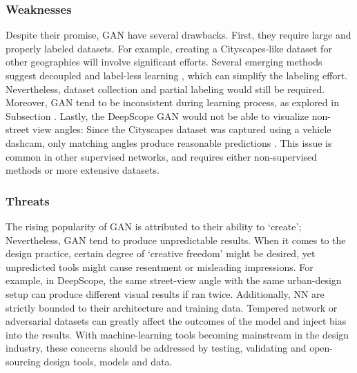 {{        \subsubsection{Weaknesses}\label{weaknesses}
        {
            Despite their promise, GAN have several drawbacks. First, they require large and properly labeled datasets. For example, creating a Cityscapes-like dataset for other geographies will involve significant efforts. Several emerging methods suggest decoupled \cite{zhu2017unpaired} and label-less learning \cite{lucic2019high}, which can simplify the labeling effort. Nevertheless, dataset collection and partial labeling would still be required. Moreover, GAN tend to be inconsistent during learning process, as explored in Subsection  \cite{shin2017continual}. Lastly, the DeepScope GAN would not be able to visualize non-street view angles: Since the Cityscapes dataset was captured using a vehicle dashcam, only matching angles produce reasonable predictions \cite{salimans2016improved}. This issue is common in other supervised networks, and requires either non-supervised methods or more extensive datasets.
        }


        \subsubsection{Threats}\label{threats}
        {
            The rising popularity of GAN is attributed to their ability to `create'; Nevertheless, GAN tend to produce unpredictable results. When it comes to the design practice, certain degree of `creative freedom' might be desired, yet unpredicted tools might cause resentment or misleading impressions. For example, in DeepScope, the same street-view angle with the same urban-design setup can produce different visual results if ran twice. Additionally, NN are strictly bounded to their architecture and training data. Tempered network or adversarial datasets can greatly affect the outcomes of the model and inject bias into the results. With machine-learning tools becoming mainstream in the design industry, these concerns should be addressed by testing, validating and open-sourcing design tools, models and data.
        }


}}
